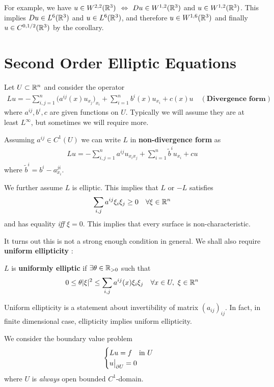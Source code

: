 \documentclass[12pt,a4paper]{report}
\begin{document}
For example, we have $u \in W^{2,2}(\mathbb{R}^3)$ $\Leftrightarrow$ $Du \in W^{1,2}(\mathbb{R}^3)$ and $u \in W^{1,2}(\mathbb{R}^3)$. This implies $Du \in L^6(\mathbb{R}^3)$ and $u\in L^6(\mathbb{R}^3)$, and therefore $u\in W^{1,6}(\mathbb{R}^3)$ and finally $u \in C^{0,1/2}(\mathbb{R}^3)$ by the corollary.
\s

\section*{Second Order Elliptic Equations}

Let $U\subset \mathbb{R}^n$ and consider the operator
\begin{align*}
Lu = - \sum_{i,j=1}^n \big( a^{ij}(x) u_{x_j} \big)_{x_i} + \sum_{i=1}^n b^i (x) u_{x_i} + c(x)u \quad (\textbf{Divergence form})
\end{align*}
where $a^{ij},b^i,c$ are given functions on $U$. Typically we will assume they are at least $L^{\infty}$, but sometimes we will require more. 

\quad Assuming $a^{ij} \in C^{1}(U)$ we can write $L$ in \textbf{non-divergence form} as
\begin{align*}
Lu = -\sum_{i,j=1}^n a^{ij}u_{x_i x_j} + \sum_{i=1}^n \tilde{b}^i u_{x_i} + cu 
\end{align*}
where $\tilde{b}^i = b^i - a^{ji}_{x_i}$.

\quad We further assume $L$ is elliptic. This implies that $L$ or $-L$ satisfies
\begin{align*}
\sum_{i,j} a^{ij} \xi_i \xi_j \geq 0 \quad \forall \xi \in \mathbb{R}^n
\end{align*}
and has equality \emph{iff} $\xi=0$. This implies that every surface is non-characteristic. 
\s

It turns out this is not a strong enough condition in general. We shall also require \textbf{uniform ellipticity} :
\s

 $L$ is \textbf{uniformly elliptic} if $\exists \theta \in \mathbb{R}_{>0}$ such that
\begin{align*}
0 \leq \theta |\xi|^2 \leq \sum_{i,j} a^{ij}(x) \xi_i \xi_j \quad \forall x\in U, \,\, \xi\in \mathbb{R}^n
\end{align*}
\s

Uniform ellipticity is a statement about invertibility of matrix $(a_{ij})_{ij}$. In fact, in finite dimensional case, ellipticity implies uniform ellipticity.
\s

We consider the boundary value problem
\begin{align}
\begin{cases} 
Lu = f \quad \text{in } U \\
u\big|_{\partial U} =0
\end{cases} \label{12}
\end{align} 
where $U$ is \emph{always} open bounded $C^1$-domain.
\s
\end{document}
